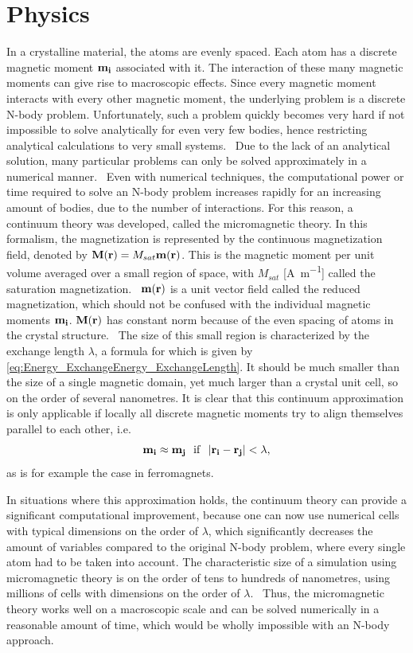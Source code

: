 \documentclass[11pt,a4paper,english]{article}
\begin{document}
\section{Physics}
In a crystalline material, the atoms are evenly spaced. Each atom has a discrete magnetic moment $\vb{m_i}$ associated with it. The interaction of these many magnetic moments can give rise to macroscopic effects. Since every magnetic moment interacts with every other magnetic moment, the underlying problem is a discrete N-body problem. Unfortunately, such a problem quickly becomes very hard if not impossible to solve analytically for even very few bodies, hence restricting analytical calculations to very small systems.~\cite{abert2013discrete} Due to the lack of an analytical solution, many particular problems can only be solved approximately in a numerical manner.~\cite{abert2013discrete} Even with numerical techniques, the computational power or time required to solve an N-body problem increases rapidly for an increasing amount of bodies, due to the number of interactions. For this reason, a continuum theory was developed, called the micromagnetic theory. In this formalism, the magnetization is represented by the continuous magnetization field, denoted by $\vb{M}(\vb{r}) = M_{sat} \vb{m}(\vb{r})$. This is the magnetic moment per unit volume averaged over a small region of space, with $M_{sat}$ [\si{\ampere\per\metre}] called the saturation magnetization.~\cite{Gilbert1956} $\vb{m}(\vb{r})$ is a unit vector field called the reduced magnetization, which should not be confused with the individual magnetic moments $\vb{m_i}$. $\vb{M}(\vb{r})$ has constant norm because of the even spacing of atoms in the crystal structure.~\cite{abert2013discrete}
The size of this small region is characterized by the exchange length $\lambda$, a formula for which is given by \cref{eq:Energy_ExchangeEnergy_ExchangeLength}. It should be much smaller than the size of a single magnetic domain, yet much larger than a crystal unit cell, so on the order of several nanometres. It is clear that this continuum approximation is only applicable if locally all discrete magnetic moments try to align themselves parallel to each other, i.e.
\begin{equation}
    \vb{m_i} \approx \vb{m_j}~~\mathrm{if}~~\abs{\vb{r_i} - \vb{r_j}} < \lambda \mathrm{,}
\end{equation}
as is for example the case in ferromagnets.~\cite{abert2013discrete} \par
In situations where this approximation holds, the continuum theory can provide a significant computational improvement, because one can now use numerical cells with typical dimensions on the order of $\lambda$, which significantly decreases the amount of variables compared to the original N-body problem, where every single atom had to be taken into account. The characteristic size of a simulation using micromagnetic theory is on the order of tens to hundreds of nanometres, using millions of cells with dimensions on the order of $\lambda$.~\cite{abert2013discrete} Thus, the micromagnetic theory works well on a macroscopic scale and can be solved numerically in a reasonable amount of time, which would be wholly impossible with an N-body approach.
\end{document}
